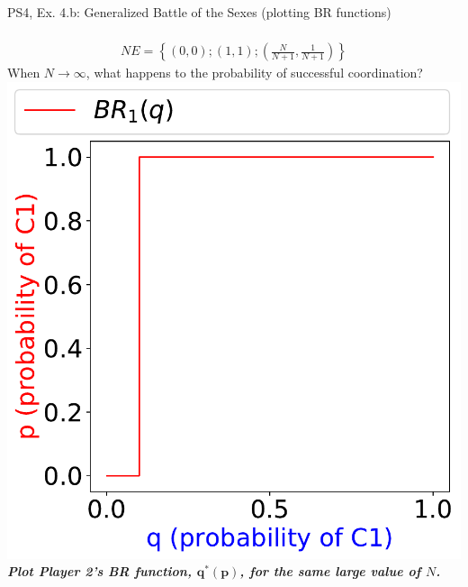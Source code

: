 \begin{frame}{PS4, Ex. 4.b: Generalized Battle of the Sexes (plotting BR functions)}
\begin{multicols}{2}
\begin{align*}
    \end{align*}
    \vspace{-6pt}
    \begin{align*}
      NE=\left\{(0,0);(1,1);\left(\frac{N}{N+1},\frac{1}{N+1}\right)\right\}
    \end{align*}
  \vfill\null \columnbreak
    When $N\rightarrow\infty$, what happens to the probability of successful coordination?\\\medskip
    \includegraphics[width=\columnwidth]{figures/4b_}
    \textbf{\textit{Plot Player 2's BR function, $\bm{q^{*}(p)}$, for the same large value of $N$.}}
  \vfill\null
  \end{multicols}
\end{frame}
